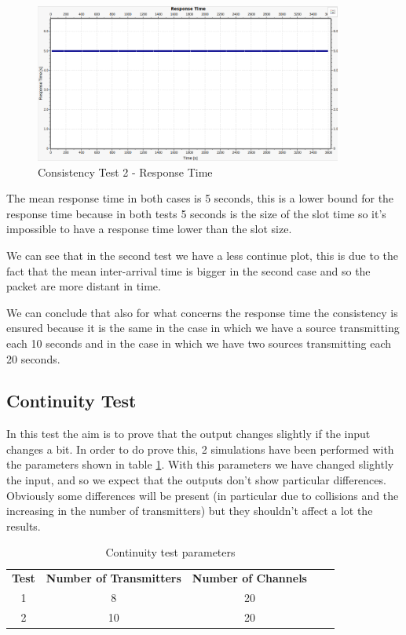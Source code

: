 \begin{figure}[H]
	\centering
	\includegraphics[width=0.9\textwidth]{img/consistencytest1b_responsetime.png}
	\caption{Consistency Test 2 - Response Time}
	\label {img: consistencyTest1b_responsetime}
\end{figure}


\noindent The mean response time in both cases is 5 seconds, this is a lower bound for the response time because in both tests 5 seconds is the size of the slot time so it's impossible to have a response time lower than the slot size.

\noindent We can see that in the second test we have a less continue plot, this is due to the fact that the mean inter-arrival time is bigger in the second case and so the packet are more distant in time.

\noindent We can conclude that also for what concerns the response time the consistency is ensured because it is the same in the case in which we have a source transmitting each 10 seconds and in the case in which we have two sources transmitting each 20 seconds. 

\subsection{Continuity Test}
In this test the aim is to prove that the output changes slightly if the input changes a bit. In order to do prove this, 2 simulations have been performed with the parameters shown in table \ref{tab: continuity test}. With this parameters we have changed slightly the input, and so we expect that the outputs don't show particular differences. Obviously some differences will be present (in particular due to collisions and the increasing in the number of transmitters) but they shouldn't affect a lot the results.

\begin{table}[htpb]
	\centering
		\begin{tabular}{|c|c|c|ll}
			\cline{1-3}
			{\textbf{Test}} & { \textbf{Number of Transmitters}} & { \textbf{Number of Channels}} &  &  \\ \cline{1-3}
			1 & 8  & 20 &  &  \\ \cline{1-3}
			2 & 10 & 20 &  &  \\ \cline{1-3}
		\end{tabular}
	\caption{Continuity test parameters}
	\label{tab: continuity test}
\end{table}

